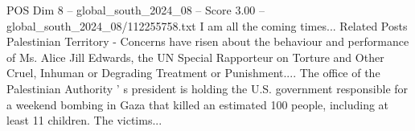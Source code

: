 \begin{textsample}{POS Dim 8 – global\_south\_2024\_08 – Score 3.00 – global\_south\_2024\_08/112255758.txt}
I am all the coming times...
Related Posts Palestinian Territory - Concerns have risen about the behaviour and performance of Ms.
Alice Jill Edwards, the UN Special Rapporteur on Torture and Other Cruel, Inhuman or Degrading Treatment or Punishment....
The office of the Palestinian Authority ' s president is holding the U.S. government responsible for a weekend bombing in Gaza that killed an estimated 100 people, including at least 11 children.
The victims...

\end{textsample}

